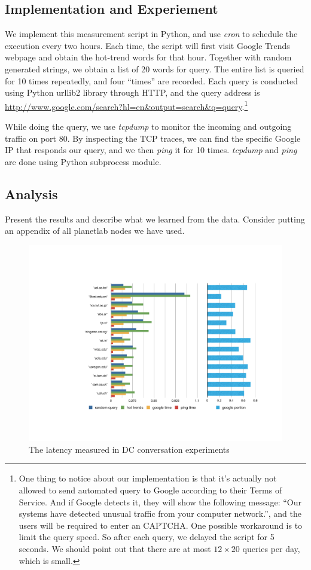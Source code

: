 \subsection{Implementation and Experiement}
\label{sec:impl-exper}


We implement this measurement script in Python, and use {\it cron} to schedule the execution every two hours. Each time, the script will first visit Google Trends webpage and obtain the hot-trend words for that hour. Together with random generated strings, we obtain a list of 20 words for query. 
The entire list is queried for 10 times repeatedly, and four ``times'' are recorded. Each query is conducted using Python urllib2 library through HTTP, and the query address is \url{http://www.google.com/search?hl=en\&output=search\&q=query}.\footnote{One thing to notice about our implementation is that it's actually not allowed to send automated query to Google according to their Terms of Service. And if Google detects it, they will show the following message: ``Our systems have detected unusual traffic from your computer network.'', and the users will be required to enter an CAPTCHA. One possible workaround is to limit the query speed. So after each query, we delayed the script for 5 seconds. We should point out that there are at most $12\times20$ queries per day, which is small.}

While doing the query, we use {\it tcpdump} to monitor the incoming and outgoing traffic on port 80. By inspecting the TCP traces, we can find the specific Google IP that responds our query, and we then {\it ping} it for 10 times.  {\it tcpdump} and {\it ping} are done using Python subprocess module.


\subsection{Analysis}
\label{sec:analysis}

Present the results and describe what we learned from the data.
Consider putting an appendix of all planetlab nodes we have used.

\begin{figure}[!htb]
  \centering
  \includegraphics[width=\linewidth]{../figs/data_center.pdf}
  \caption{The latency measured in DC conversation experiments}
  \label{fig:data_center}
\end{figure}



